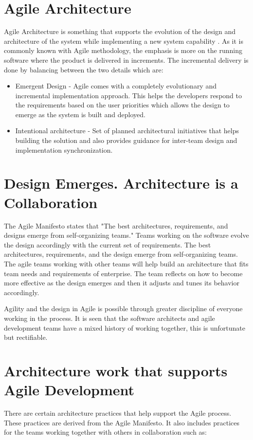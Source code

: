 \documentclass[sigconf]{acmart}
\begin{document}
\section{Agile Architecture}
Agile Architecture is something that supports the evolution of the design and architecture of the system while implementing a new system capability \cite{Saf01}. As it is commonly known with Agile methodology, the emphasis is more on the running software where the product is delivered in increments. The incremental delivery is done by balancing between the two details which are:

\begin{itemize}
  \item Emergent Design - Agile comes with a completely evolutionary and incremental implementation approach. This helps the developers respond to the requirements based on the user priorities which allows the design to emerge as the system is built and deployed. 

  \item Intentional architecture - Set of planned architectural initiatives that helps building the solution and also provides guidance for inter-team design and implementation synchronization.
\end{itemize}

\section{Design Emerges. Architecture is a Collaboration}
The Agile Manifesto states that "The best architectures, requirements, and designs emerge from self-organizing teams." Teams working on the software evolve the design accordingly with the current set of requirements. The best architectures, requirements, and the design emerge from self-organizing teams. The agile teams working with other teams will help build an architecture that fits team needs and requirements of enterprise. The team reflects on how to become more effective as the design emerges and then it adjusts and tunes its behavior accordingly.

Agility and the design in Agile is possible through greater discipline of everyone working in the process. It is seen that the software architects and agile development teams have a mixed history of working together, this is unfortunate but rectifiable.

\section{Architecture work that supports Agile Development}
There are certain architecture practices that help support the Agile process. These practices\cite{Eoin1} are derived from the Agile Manifesto\cite{Am01}. It also includes practices for the teams working together with others in collaboration such as:
\end{document}
